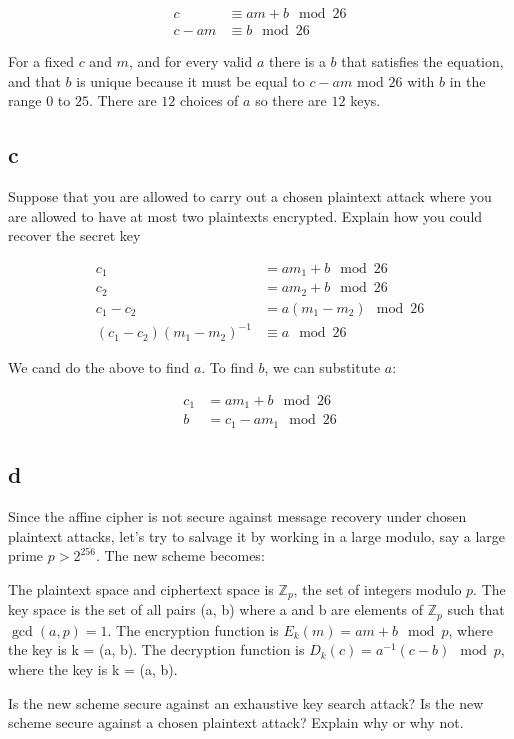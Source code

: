 \documentclass[11pt]{article}
\begin{document}
\begin{align*}
    c &\equiv am + b \mod 26 \\
    c - am &\equiv b \mod 26
\end{align*}

For a fixed $c$ and $m$, and for every valid $a$ there is a $b$ that satisfies the equation, and that $b$ is unique because it must be equal to $c - am$ mod $26$ with $b$ in the range $0$ to $25$. There are $12$ choices of $a$ so there are $12$ keys. 

\subsection{c} Suppose that you are allowed to carry out a chosen plaintext attack where you are allowed to have at most two plaintexts encrypted. Explain how you could recover the secret key

\begin{align*}
    c_1 &= am_1 + b \mod 26 \\
    c_2 &= am_2 + b \mod 26 \\
    c_1 - c_2 &= a(m_1 - m_2) \mod 26 \\
    (c_1 - c_2) (m_1 - m_2)^{-1} &\equiv a \mod 26
\end{align*}

We cand do the above to find $a$. To find $b$, we can substitute $a$:

\begin{align*}
    c_1 &= am_1 + b \mod 26 \\
    b &= c_1 - am_1 \mod 26
\end{align*}

\subsection{d} Since the aﬃne cipher is not secure against message recovery under chosen plaintext
attacks, let's try to salvage it by working in a large modulo, say a large prime $p > 2^{256}$. The
new scheme becomes:

The plaintext space and ciphertext space is $\mathbb{Z}_p$, the set of integers modulo $p$.
The key space is the set of all pairs (a, b) where a and b are elements of $\mathbb{Z}_p$ such that $\gcd(a, p) = 1$.
The encryption function is $E_k(m) = am + b \mod p$, where the key is k = (a, b).
The decryption function is $D_k(c) = a^{-1}(c - b) \mod p$, where the key is k = (a, b).

Is the new scheme secure against an exhaustive key search attack?
Is the new scheme secure against a chosen plaintext attack? Explain why or why not.
\end{document}
